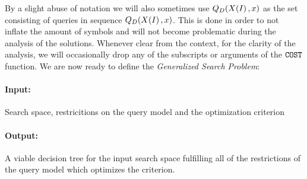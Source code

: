 By a slight abuse of notation we will also sometimes use $Q_{D}\mathopen{}\left( X\mathopen{}\left( I \right),x \right)$ as the set consisting of queries in sequence $Q_{D}\mathopen{}\left( X\mathopen{}\left( I \right),x \right)$. This is done in order to not inflate the amount of symbols and will not become problematic during the analysis of the solutions.
Whenever clear from the context, for the clarity of the analysis, we will occasionally drop any of the subscripts or arguments of the $\texttt{COST}$ function.
We are now ready to define the \textit{Generalized Search Problem}:

\begin{tcolorbox}[colback=white, title=Generalized Search Problem, fonttitle=\bfseries, breakable]
\paragraph{Input:} Search space, restricitions on the query model and the optimization criterion
\paragraph{Output:} A viable decision tree for the input search space fulfilling all of the restrictions of the query model which optimizes the criterion.
\end{tcolorbox}